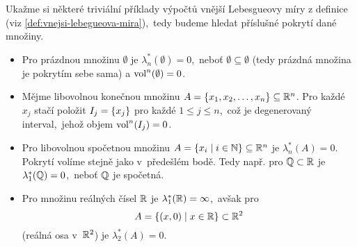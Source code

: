 \begin{example}\label{ex:lebegueova-mira-trivialni-priklady}
    Ukažme si některé triviální příklady výpočtů vnější Lebesgueovy míry z definice (viz \ref{def:vnejsi-lebegueova-mira}),~tedy budeme hledat příslušné pokrytí dané množiny.
    \begin{itemize}
        \item Pro prázdnou množinu $\emptyset$ je $\lambda_n^*(\emptyset)=0$,~neboť $\emptyset\subseteq\emptyset$ (tedy prázdná množina je pokrytím sebe sama) a $\operatorname{vol}^n(\emptyset)=0$.
        \item Mějme libovolnou konečnou množinu $A=\left\{x_1,x_2,\dots,x_n\right\}\subseteq\mathbb{R}^n$. Pro každé $x_j$ stačí položit $I_j=\left\{x_j\right\}$ pro každé $1\leqslant j\leqslant n$,~což je degenerovaný interval,~jehož objem $\operatorname{vol}^n(I_j)=0$.
        \item Pro libovolnou spočetnou množinu $A=\left\{x_i\mid i\in\mathbb{N}\right\}\subseteq\mathbb{R}^n$ je $\lambda_n^*(A)=0$. Pokrytí volíme stejně jako v~předešlém bodě. Tedy např. pro $\mathbb{Q}\subset\mathbb{R}$ je $\lambda_1^*(\mathbb{Q})=0$,~neboť $\mathbb{Q}$ je spočetná.
        \item Pro množinu reálných čísel $\mathbb{R}$ je $\lambda_1^*(\mathbb{R})=\infty$,~avšak pro 
        \[A=\left\{(x,0)\mid x\in\mathbb{R}\right\}\subset\mathbb{R}^2\]
        (reálná osa v~$\mathbb{R}^2$) je $\lambda_2^*(A)=0$.
    \end{itemize}
\end{example}
